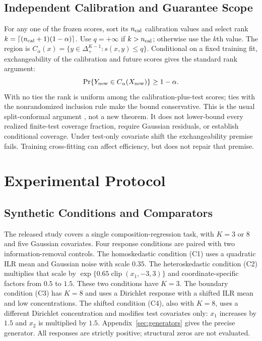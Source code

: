 \documentclass{article}
\newcommand{\simplex}{\Delta^{K-1}_{+}}
\newcommand{\clip}{\operatorname{clip}}
\begin{document}
\subsection{Independent Calibration and Guarantee Scope}
For any one of the frozen scores, sort its $n_{\rm cal}$ calibration values and select rank $k=\lceil(n_{\rm cal}+1)(1-\alpha)\rceil$. Use $q=+\infty$ if $k>n_{\rm cal}$; otherwise use the $k$th value. The region is $C_\alpha(x)=\{y\in\simplex:s(x,y)\le q\}$. Conditional on a fixed training fit, exchangeability of the calibration and future scores gives the standard rank argument:
\begin{equation}
 \Pr\{Y_{\rm new}\in C_\alpha(X_{\rm new})\}\ge 1-\alpha.
 \label{eq:coverage}
\end{equation}
With no ties the rank is uniform among the calibration-plus-test scores; ties with the nonrandomized inclusion rule make the bound conservative. This is the usual split-conformal argument \citep{Lei2018,Angelopoulos2021}, not a new theorem. It does not lower-bound every realized finite-test coverage fraction, require Gaussian residuals, or establish conditional coverage. Under test-only covariate shift the exchangeability premise fails. Training cross-fitting can affect efficiency, but does not repair that premise.

\section{Experimental Protocol}
\subsection{Synthetic Conditions and Comparators}
The released study covers a single composition-regression task, with $K=3$ or $8$ and five Gaussian covariates. Four response conditions are paired with two information-removal controls. The homoskedastic condition (C1) uses a quadratic ILR mean and Gaussian noise with scale $0.35$. The heteroskedastic condition (C2) multiplies that scale by $\exp\{0.65\clip(x_1,-3,3)\}$ and coordinate-specific factors from $0.5$ to $1.5$. These two conditions have $K=3$. The boundary condition (C3) has $K=8$ and uses a Dirichlet response with a shifted ILR mean and low concentrations. The shifted condition (C4), also with $K=8$, uses a different Dirichlet concentration and modifies test covariates only: $x_1$ increases by $1.5$ and $x_2$ is multiplied by $1.5$. Appendix~\ref{sec:generators} gives the precise generator. All responses are strictly positive; structural zeros are not evaluated.
\end{document}
